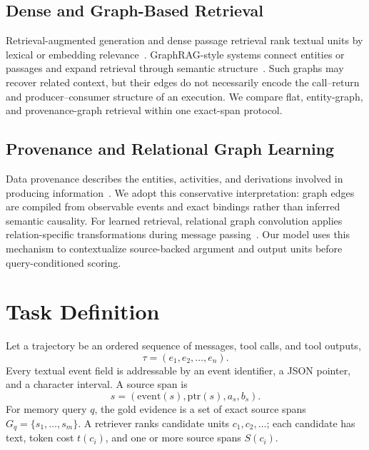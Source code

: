 \documentclass[sigconf,anonymous,review]{acmart}
\begin{document}
\subsection{Dense and Graph-Based Retrieval}
Retrieval-augmented generation and dense passage retrieval rank textual units by lexical or embedding relevance~\cite{lewis2020rag,karpukhin2020dpr}. GraphRAG-style systems connect entities or passages and expand retrieval through semantic structure~\cite{edge2024graphrag,gutierrez2024hipporag,guo2024lightrag}. Such graphs may recover related context, but their edges do not necessarily encode the call--return and producer--consumer structure of an execution. We compare flat, entity-graph, and provenance-graph retrieval within one exact-span protocol.

\subsection{Provenance and Relational Graph Learning}
Data provenance describes the entities, activities, and derivations involved in producing information~\cite{w3c2013provdm,lebo2013provo,missier2013prov}. We adopt this conservative interpretation: graph edges are compiled from observable events and exact bindings rather than inferred semantic causality. For learned retrieval, relational graph convolution applies relation-specific transformations during message passing~\cite{schlichtkrull2018modeling}. Our model uses this mechanism to contextualize source-backed argument and output units before query-conditioned scoring.

\section{Task Definition}
\label{sec:task}

Let a trajectory be an ordered sequence of messages, tool calls, and tool outputs,
\begin{equation}
\tau = (e_1, e_2, \ldots, e_n).
\end{equation}
Every textual event field is addressable by an event identifier, a JSON pointer, and a character interval. A source span is
\begin{equation}
s=(\mathrm{event}(s),\mathrm{ptr}(s),a_s,b_s).
\end{equation}
For memory query $q$, the gold evidence is a set of exact source spans $G_q=\{s_1,\ldots,s_m\}$. A retriever ranks candidate units $c_1,c_2,\ldots$; each candidate has text, token cost $t(c_i)$, and one or more source spans $S(c_i)$.
\end{document}

